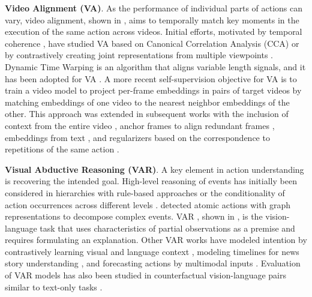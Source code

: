 \noindent
\textbf{Video Alignment (VA)}. As the performance of individual parts of actions can vary, video alignment, shown in , aims to temporally match key moments in the execution of the same action across videos. Initial efforts, motivated by temporal coherence , have studied VA based on Canonical Correlation Analysis (CCA)  or by contrastively creating joint representations from multiple viewpoints . Dynamic Time Warping  is an algorithm that aligns variable length signals, and it has been adopted for VA . A more recent self-supervision objective  for VA is to train a video model to project per-frame embeddings in pairs of target videos by matching embeddings of one video to the nearest neighbor embeddings of the other. This approach was extended in subsequent works with the inclusion of context from the entire video , anchor frames to align redundant frames , embeddings from text , and regularizers based on the correspondence to repetitions of the same action .


\noindent
\textbf{Visual Abductive Reasoning (VAR)}. A key element in action understanding is recovering the intended goal. High-level reasoning of events has initially been considered in hierarchies with rule-based approaches  or the conditionality of action occurrences across different levels .  detected atomic actions with graph representations to decompose complex events. VAR , shown in , is the vision-language task that uses characteristics of partial observations as a premise and requires formulating an explanation. Other VAR works have modeled intention by contrastively learning visual and language context , modeling timelines for news story understanding , and forecasting actions by multimodal inputs . Evaluation of VAR models has also been studied in counterfactual vision-language pairs  similar to text-only tasks .

